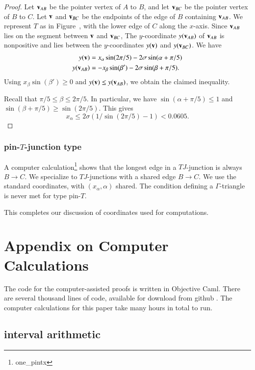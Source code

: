 \begin{proof} Let ${\mathbf v}_{AB}$ be the pointer vertex of $A$ to $B$, and
  let ${\mathbf v}_{BC}$ be the pointer vertex of $B$ to $C$.  Let ${\mathbf v}$ and
  ${\mathbf v}_{BC}$ be the endpoints of the edge of $B$ containing ${\mathbf v}_{AB}$.
  We represent $T$ as in Figure~, with the lower edge of
  $C$ along the $x$-axis.  Since ${\mathbf v}_{AB}$ lies on the segment between
  ${\mathbf v}$ and ${\mathbf v}_{BC}$, The $y$-coordinate $y({\mathbf v}_{AB})$ of ${\mathbf v}_{AB}$ is
  nonpositive and lies between the $y$-coordinates $y({\mathbf v})$ and
  $y({\mathbf v}_{BC})$.  We have
\begin{align*}
y({\mathbf v}) &= x_\alpha \sin(2\pi/5) - 2\sigma\sin(\alpha+\pi/5)\\
y({\mathbf v}_{AB}) & = -x_\beta \sin(\beta') - 2\sigma\sin(\beta+\pi/5).
\end{align*}
Using $x_\beta \sin(\beta')\ge 0$ and $y({\mathbf v}) \le y({\mathbf v}_{AB})$, we
obtain the claimed inequality.

Recall that $\pi/5\le \beta \le 2\pi/5$.  In particular, we have
$\sin(\alpha+\pi/5) \le 1$ and $\sin(\beta+\pi/5)\ge \sin(2\pi/5)$.
This gives
\[
x_\alpha \le 2\sigma(1/\sin(2\pi/5) - 1) < 0.0605.
\]
\end{proof}

\subsubsection{pin-$T$-junction type}

A computer calculation\footnote{one\_pintx} shows that the longest
edge in a $TJ$-junction is always $B\to C$.  We specialize to
$TJ$-junctions with a shared edge $B\to C$.  We use the standard
coordinates, with $(x_\alpha,\alpha)$ shared.  The condition defining
a $\Gamma$-triangle is never met for type pin-$T$.


This completes our discussion of coordinates used for computations.

\section{Appendix on Computer Calculations}

  The code for the computer-assisted proofs is written in Objective
  Caml.  There are several thousand lines of code, available for
  download from github \cite{Git}.  The computer calculations for this
  paper take many hours in total to run.  


\subsection{interval arithmetic}

